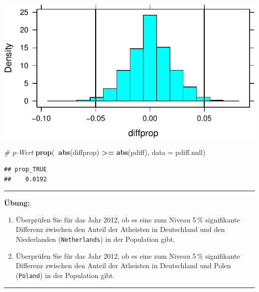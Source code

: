 \documentclass[12pt,ngerman,paper=a4,pagesize,DIV=13]{scrreprt}
\newenvironment{Shaded}{\begin{snugshade}}{\end{snugshade}}
\newcommand{\CommentTok}[1]{\textcolor[rgb]{0.56,0.35,0.01}{\textit{#1}}}
\newcommand{\DataTypeTok}[1]{\textcolor[rgb]{0.13,0.29,0.53}{#1}}
\newcommand{\KeywordTok}[1]{\textcolor[rgb]{0.13,0.29,0.53}{\textbf{#1}}}
\newcommand{\NormalTok}[1]{#1}
\newcommand{\OperatorTok}[1]{\textcolor[rgb]{0.81,0.36,0.00}{\textbf{#1}}}
\newcommand{\StringTok}[1]{\textcolor[rgb]{0.31,0.60,0.02}{#1}}
\providecommand{\tightlist}{%
  \setlength{\itemsep}{0pt}\setlength{\parskip}{0pt}}
\begin{document}
\includegraphics{DatenerhebungStatistik-Uebung_files/figure-latex/unnamed-chunk-113-1.pdf}

\begin{Shaded}
\begin{Highlighting}[]
\CommentTok{# p-Wert}
\KeywordTok{prop}\NormalTok{(}\OperatorTok{~}\KeywordTok{abs}\NormalTok{(diffprop) }\OperatorTok{>=}\StringTok{ }\KeywordTok{abs}\NormalTok{(pdiff), }\DataTypeTok{data =}\NormalTok{ pdiff.null)}
\end{Highlighting}
\end{Shaded}

\begin{verbatim}
## prop_TRUE 
##    0.0192
\end{verbatim}

\begin{center}\rule{0.5\linewidth}{\linethickness}\end{center}

\textbf{Übung:}

\begin{enumerate}
\def\labelenumi{\arabic{enumi}.}
\setcounter{enumi}{4}
\tightlist
\item
  Überprüfen Sie für das Jahr 2012, ob es eine zum Niveau 5\(\,\)\%
  signifikante Differenz zwischen den Anteil der Atheisten in
  Deutschland und den Niederlanden (\texttt{Netherlands}) in der
  Population gibt.
\item
  Überprüfen Sie für das Jahr 2012, ob es eine zum Niveau 5\(\,\)\%
  signifikante Differenz zwischen den Anteil der Atheisten in
  Deutschland und Polen (\texttt{Poland}) in der Population gibt.
\end{enumerate}

\begin{center}\rule{0.5\linewidth}{\linethickness}\end{center}
\end{document}
